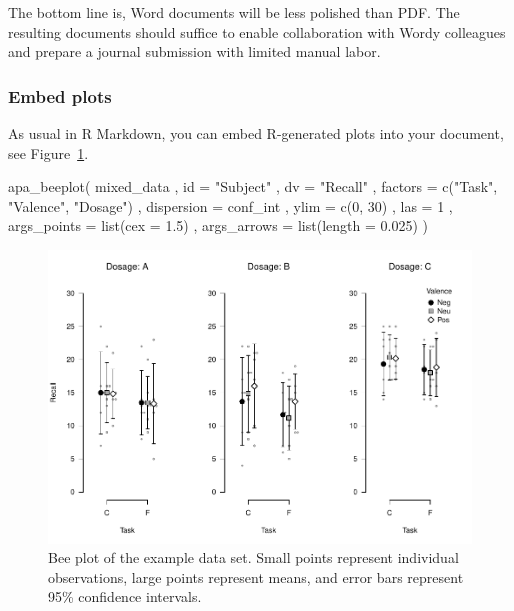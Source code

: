 \documentclass[
  man,floatsintext]{apa6}
\newenvironment{Shaded}{\begin{snugshade}}{\end{snugshade}}
\newcommand{\AttributeTok}[1]{\textcolor[rgb]{0.77,0.63,0.00}{#1}}
\newcommand{\DecValTok}[1]{\textcolor[rgb]{0.00,0.00,0.81}{#1}}
\newcommand{\FloatTok}[1]{\textcolor[rgb]{0.00,0.00,0.81}{#1}}
\newcommand{\FunctionTok}[1]{\textcolor[rgb]{0.00,0.00,0.00}{#1}}
\newcommand{\NormalTok}[1]{#1}
\newcommand{\StringTok}[1]{\textcolor[rgb]{0.31,0.60,0.02}{#1}}
\begin{document}
The bottom line is, Word documents will be less polished than PDF.
The resulting documents should suffice to enable collaboration with Wordy colleagues and prepare a journal submission with limited manual labor.

\hypertarget{embed-plots}{%
\subsubsection{Embed plots}\label{embed-plots}}

As usual in R Markdown, you can embed R-generated plots into your document, see Figure~\ref{fig:beeplot}.



\begin{Shaded}
\begin{Highlighting}[]
\FunctionTok{apa\_beeplot}\NormalTok{(}
\NormalTok{  mixed\_data}
\NormalTok{  , }\AttributeTok{id =} \StringTok{"Subject"}
\NormalTok{  , }\AttributeTok{dv =} \StringTok{"Recall"}
\NormalTok{  , }\AttributeTok{factors =} \FunctionTok{c}\NormalTok{(}\StringTok{"Task"}\NormalTok{, }\StringTok{"Valence"}\NormalTok{, }\StringTok{"Dosage"}\NormalTok{)}
\NormalTok{  , }\AttributeTok{dispersion =}\NormalTok{ conf\_int}
\NormalTok{  , }\AttributeTok{ylim =} \FunctionTok{c}\NormalTok{(}\DecValTok{0}\NormalTok{, }\DecValTok{30}\NormalTok{)}
\NormalTok{  , }\AttributeTok{las =} \DecValTok{1}
\NormalTok{  , }\AttributeTok{args\_points =} \FunctionTok{list}\NormalTok{(}\AttributeTok{cex =} \FloatTok{1.5}\NormalTok{)}
\NormalTok{  , }\AttributeTok{args\_arrows =} \FunctionTok{list}\NormalTok{(}\AttributeTok{length =} \FloatTok{0.025}\NormalTok{)}
\NormalTok{)}
\end{Highlighting}
\end{Shaded}

\begin{figure}
\centering
\includegraphics{example_files/figure-latex/beeplot-1.pdf}
\caption{\label{fig:beeplot}Bee plot of the example data set. Small points represent individual observations, large points represent means, and error bars represent 95\% confidence intervals.}
\end{figure}
\end{document}
